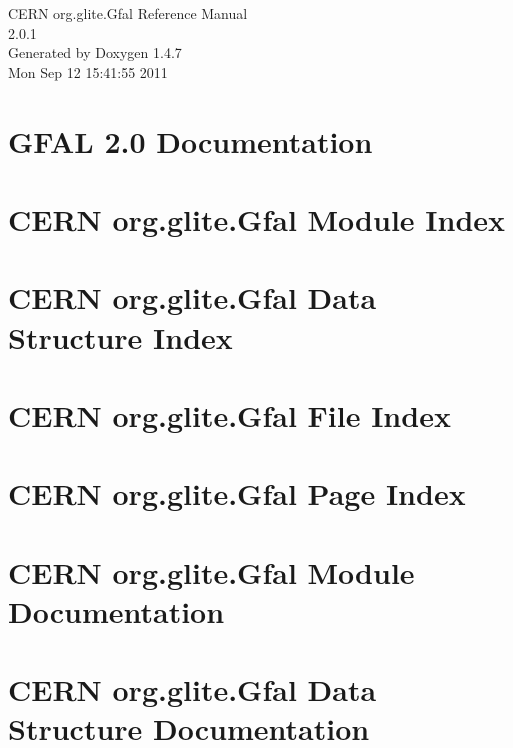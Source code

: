 \documentclass[a4paper]{book}
\begin{document}
\begin{titlepage}
\vspace*{7cm}
\begin{center}
{\Large CERN org.glite.Gfal Reference Manual\\[1ex]\large 2.0.1 }\\
\vspace*{1cm}
{\large Generated by Doxygen 1.4.7}\\
\vspace*{0.5cm}
{\small Mon Sep 12 15:41:55 2011}\\
\end{center}
\end{titlepage}
\clearemptydoublepage
{}
\tableofcontents
\clearemptydoublepage
{}
\chapter{GFAL 2.0 Documentation }
\label{index}
\chapter{CERN org.glite.Gfal Module Index}

\chapter{CERN org.glite.Gfal Data Structure Index}

\chapter{CERN org.glite.Gfal File Index}

\chapter{CERN org.glite.Gfal Page Index}

\chapter{CERN org.glite.Gfal Module Documentation}

\chapter{CERN org.glite.Gfal Data Structure Documentation}





\end{document}

